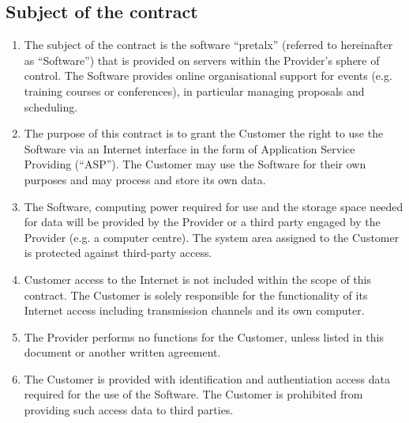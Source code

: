 \documentclass{terms}
\begin{document}
\subsection{Subject of the contract}
\begin{enumerate}
\item The subject of the contract is the software “pretalx” (referred to hereinafter as “Software”) that is provided on servers within the Provider's sphere of control.
      The Software provides online organisational support for events (e.g. training courses or conferences), in particular managing proposals and scheduling.
\item The purpose of this contract is to grant the Customer the right to use the Software via an Internet interface in the form of Application Service Providing (“ASP”).
      The Customer may use the Software for their own purposes and may process and store its own data.
\item The Software, computing power required for use and the storage space needed for data will be provided by the Provider or a third party engaged by the Provider (e.g. a computer centre).
      The system area assigned to the Customer is protected against third-party access.
\item Customer access to the Internet is not included within the scope of this contract.
      The Customer is solely responsible for the functionality of its Internet access including transmission channels and its own computer.
\item The Provider performs no functions for the Customer, unless listed in this document or another written agreement.
\item The Customer is provided with identification and authentiation access data required for the use of the Software.
      The Customer is prohibited from providing such access data to third parties.
\end{enumerate}
\end{document}
